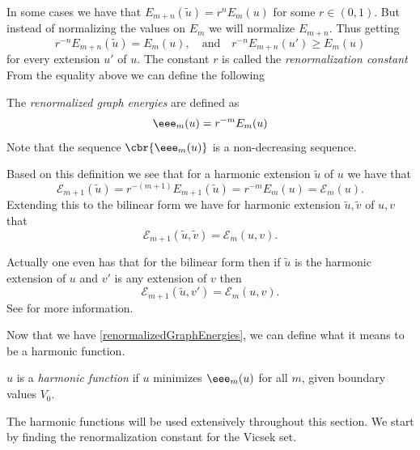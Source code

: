 In some cases we have that $E_{m+n}(\tilde{u}) = r^{n} E_{m}(u)$ for some $r \in (0, 1)$. But instead of normalizing the values on $E_m$ we will normalize $E_{m+n}$. Thus  getting
\begin{equation}
	r^{-n} E_{m+n}(\tilde{u}) = E_m(u), \quad \text{and} \quad r^{-n} E_{m+n}(u') \geq E_m(u)
\end{equation}
for every extension $u'$ of $u$. The constant $r$ is called the \emph{renormalization constant} From the equality above we can define the following
\begin{defi}\label{renormalizedGraphEnergies}
	The \emph{renormalized graph energies} are defined as
	\begin{equation}
		\eee_{m}(u) = r^{-m}E_m(u)
	\end{equation}
	Note that the sequence $\cbr{\eee_{m}(u)}$ is a non-decreasing sequence. 
\end{defi}

Based on this definition we see that for a harmonic extension $\tilde{u}$ of $u$ we have that 
\begin{equation}
	\mathcal{E}_{m+1}(\tilde{u}) = r^{-(m+1)}E_{m+1}(\tilde{u}) = r^{-m}E_{m}(u) = \mathcal{E}_{m}(u).
\end{equation}
Extending this to the bilinear form we have for harmonic extension $\tilde{u}, \tilde{v}$ of $u, v$ that
\begin{equation}
	\mathcal{E}_{m+1}(\tilde{u}, \tilde{v}) = \mathcal{E}_{m}(u,v).
\end{equation}

Actually one even has that for the bilinear form then if $\tilde{u}$ is the harmonic extension of $u$ and $v'$ is any extension of $v$ then
\begin{equation}\label{bilinearFormRenormalized}
	\mathcal{E}_{m+1}(\tilde{u}, v') = \mathcal{E}_{m}(u,v).
\end{equation}
See \cite{strichartz} for more information.

Now that we have \ref{renormalizedGraphEnergies}, we can define what it means to be a harmonic function.


\begin{defi}
	$u$ is a \emph{harmonic function} if $u$ minimizes $\eee_{m}(u)$ for all $m$, given boundary values $V_0$.
\end{defi}

The harmonic functions will be used extensively throughout this section. We start by finding the renormalization constant for the Vicsek set.

